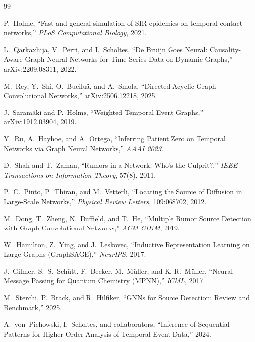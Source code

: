 \documentclass[12pt,a4paper]{report}
\begin{document}
\begin{thebibliography}{99}

  P.~Holme,
  ``Fast and general simulation of SIR epidemics on temporal contact networks,''
  \emph{PLoS Computational Biology}, 2021.

  L.~Qarkaxhija, V.~Perri, and I.~Scholtes,
  ``De Bruijn Goes Neural: Causality-Aware Graph Neural Networks for Time Series
  Data on Dynamic Graphs,''
  arXiv:2209.08311, 2022.

  M.~Rey, Y.~Shi, O.~Buciluä, and A.~Smola,
  ``Directed Acyclic Graph Convolutional Networks,''
  arXiv:2506.12218, 2025.

  J.~Saramäki and P.~Holme,
  ``Weighted Temporal Event Graphs,''
  arXiv:1912.03904, 2019.

  Y.~Ru, A.~Hayhoe, and A.~Ortega,
  ``Inferring Patient Zero on Temporal Networks via Graph Neural Networks,''
  \emph{AAAI 2023}.

  D.~Shah and T.~Zaman,
  ``Rumors in a Network: Who's the Culprit?,''
  \emph{IEEE Transactions on Information Theory}, 57(8), 2011.

  P.~C.~Pinto, P.~Thiran, and M.~Vetterli,
  ``Locating the Source of Diffusion in Large-Scale Networks,''
  \emph{Physical Review Letters}, 109:068702, 2012.

  M.~Dong, T.~Zheng, N.~Duffield, and T.~He,
  ``Multiple Rumor Source Detection with Graph Convolutional Networks,''
  \emph{ACM CIKM}, 2019.

  W.~Hamilton, Z.~Ying, and J.~Leskovec,
  ``Inductive Representation Learning on Large Graphs (GraphSAGE),''
  \emph{NeurIPS}, 2017.

  J.~Gilmer, S.~S.~Schütt, F.~Becker, M.~Müller, and K.-R.~Müller,
  ``Neural Message Passing for Quantum Chemistry (MPNN),''
  \emph{ICML}, 2017.

  M.~Sterchi, P.~Brack, and R.~Hilfiker,
  ``GNNs for Source Detection: Review and Benchmark,'' 2025.

  A.~von~Pichowski, I.~Scholtes, and collaborators,
  ``Inference of Sequential Patterns for Higher-Order Analysis of Temporal Event
  Data,'' 2024.

\end{thebibliography}
\end{document}
